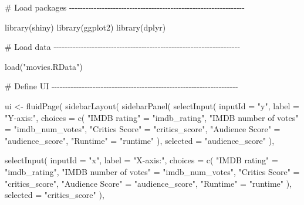 \documentclass[
  letterpaper,
  DIV=11,
  numbers=noendperiod]{scrreprt}
\newenvironment{Shaded}{\begin{snugshade}}{\end{snugshade}}
\newcommand{\AttributeTok}[1]{\textcolor[rgb]{0.40,0.46,0.14}{#1}}
\newcommand{\CommentTok}[1]{\textcolor[rgb]{0.37,0.37,0.37}{#1}}
\newcommand{\FunctionTok}[1]{\textcolor[rgb]{0.28,0.35,0.67}{#1}}
\newcommand{\NormalTok}[1]{\textcolor[rgb]{0.00,0.46,0.62}{#1}}
\newcommand{\OtherTok}[1]{\textcolor[rgb]{0.00,0.46,0.62}{#1}}
\newcommand{\StringTok}[1]{\textcolor[rgb]{0.13,0.47,0.30}{#1}}
\begin{document}
\begin{Shaded}
\begin{Highlighting}[]
\CommentTok{\# Load packages {-}{-}{-}{-}{-}{-}{-}{-}{-}{-}{-}{-}{-}{-}{-}{-}{-}{-}{-}{-}{-}{-}{-}{-}{-}{-}{-}{-}{-}{-}{-}{-}{-}{-}{-}{-}{-}{-}{-}{-}{-}{-}{-}{-}{-}{-}{-}{-}{-}{-}{-}{-}{-}{-}{-}{-}{-}{-}{-}{-}{-}{-}{-}{-}}

\FunctionTok{library}\NormalTok{(shiny)}
\FunctionTok{library}\NormalTok{(ggplot2)}
\FunctionTok{library}\NormalTok{(dplyr)}

\CommentTok{\# Load data {-}{-}{-}{-}{-}{-}{-}{-}{-}{-}{-}{-}{-}{-}{-}{-}{-}{-}{-}{-}{-}{-}{-}{-}{-}{-}{-}{-}{-}{-}{-}{-}{-}{-}{-}{-}{-}{-}{-}{-}{-}{-}{-}{-}{-}{-}{-}{-}{-}{-}{-}{-}{-}{-}{-}{-}{-}{-}{-}{-}{-}{-}{-}{-}{-}{-}{-}{-}}

\FunctionTok{load}\NormalTok{(}\StringTok{"movies.RData"}\NormalTok{)}

\CommentTok{\# Define UI {-}{-}{-}{-}{-}{-}{-}{-}{-}{-}{-}{-}{-}{-}{-}{-}{-}{-}{-}{-}{-}{-}{-}{-}{-}{-}{-}{-}{-}{-}{-}{-}{-}{-}{-}{-}{-}{-}{-}{-}{-}{-}{-}{-}{-}{-}{-}{-}{-}{-}{-}{-}{-}{-}{-}{-}{-}{-}{-}{-}{-}{-}{-}{-}{-}{-}{-}{-}}

\NormalTok{ui }\OtherTok{\textless{}{-}} \FunctionTok{fluidPage}\NormalTok{(}
  \FunctionTok{sidebarLayout}\NormalTok{(}
    \FunctionTok{sidebarPanel}\NormalTok{(}
      \FunctionTok{selectInput}\NormalTok{(}
        \AttributeTok{inputId =} \StringTok{"y"}\NormalTok{,}
        \AttributeTok{label =} \StringTok{"Y{-}axis:"}\NormalTok{,}
        \AttributeTok{choices =} \FunctionTok{c}\NormalTok{(}
          \StringTok{"IMDB rating"} \OtherTok{=} \StringTok{"imdb\_rating"}\NormalTok{,}
          \StringTok{"IMDB number of votes"} \OtherTok{=} \StringTok{"imdb\_num\_votes"}\NormalTok{,}
          \StringTok{"Critics Score"} \OtherTok{=} \StringTok{"critics\_score"}\NormalTok{,}
          \StringTok{"Audience Score"} \OtherTok{=} \StringTok{"audience\_score"}\NormalTok{,}
          \StringTok{"Runtime"} \OtherTok{=} \StringTok{"runtime"}
\NormalTok{        ),}
        \AttributeTok{selected =} \StringTok{"audience\_score"}
\NormalTok{      ),}

      \FunctionTok{selectInput}\NormalTok{(}
        \AttributeTok{inputId =} \StringTok{"x"}\NormalTok{,}
        \AttributeTok{label =} \StringTok{"X{-}axis:"}\NormalTok{,}
        \AttributeTok{choices =} \FunctionTok{c}\NormalTok{(}
          \StringTok{"IMDB rating"} \OtherTok{=} \StringTok{"imdb\_rating"}\NormalTok{,}
          \StringTok{"IMDB number of votes"} \OtherTok{=} \StringTok{"imdb\_num\_votes"}\NormalTok{,}
          \StringTok{"Critics Score"} \OtherTok{=} \StringTok{"critics\_score"}\NormalTok{,}
          \StringTok{"Audience Score"} \OtherTok{=} \StringTok{"audience\_score"}\NormalTok{,}
          \StringTok{"Runtime"} \OtherTok{=} \StringTok{"runtime"}
\NormalTok{        ),}
        \AttributeTok{selected =} \StringTok{"critics\_score"}
\NormalTok{      ),}


\end{Highlighting}
\end{Shaded}
\end{document}
